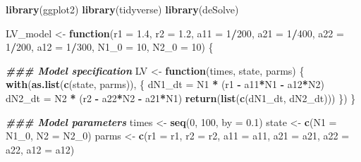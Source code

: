 \documentclass[
]{book}
\newenvironment{Shaded}{\begin{snugshade}}{\end{snugshade}}
\newcommand{\AttributeTok}[1]{\textcolor[rgb]{0.13,0.29,0.53}{#1}}
\newcommand{\ControlFlowTok}[1]{\textcolor[rgb]{0.13,0.29,0.53}{\textbf{#1}}}
\newcommand{\DecValTok}[1]{\textcolor[rgb]{0.00,0.00,0.81}{#1}}
\newcommand{\DocumentationTok}[1]{\textcolor[rgb]{0.56,0.35,0.01}{\textbf{\textit{#1}}}}
\newcommand{\FloatTok}[1]{\textcolor[rgb]{0.00,0.00,0.81}{#1}}
\newcommand{\FunctionTok}[1]{\textcolor[rgb]{0.13,0.29,0.53}{\textbf{#1}}}
\newcommand{\NormalTok}[1]{#1}
\newcommand{\OtherTok}[1]{\textcolor[rgb]{0.56,0.35,0.01}{#1}}
\newcommand{\SpecialCharTok}[1]{\textcolor[rgb]{0.81,0.36,0.00}{\textbf{#1}}}
\begin{document}
\begin{Shaded}
\begin{Highlighting}[]
\FunctionTok{library}\NormalTok{(ggplot2)}
\FunctionTok{library}\NormalTok{(tidyverse)}
\FunctionTok{library}\NormalTok{(deSolve)}

\NormalTok{LV\_model }\OtherTok{\textless{}{-}} \ControlFlowTok{function}\NormalTok{(}\AttributeTok{r1 =} \FloatTok{1.4}\NormalTok{, }\AttributeTok{r2 =} \FloatTok{1.2}\NormalTok{, }
                     \AttributeTok{a11 =} \DecValTok{1}\SpecialCharTok{/}\DecValTok{200}\NormalTok{, }\AttributeTok{a21 =} \DecValTok{1}\SpecialCharTok{/}\DecValTok{400}\NormalTok{, }\AttributeTok{a22 =} \DecValTok{1}\SpecialCharTok{/}\DecValTok{200}\NormalTok{, }\AttributeTok{a12 =} \DecValTok{1}\SpecialCharTok{/}\DecValTok{300}\NormalTok{, }
                     \AttributeTok{N1\_0 =} \DecValTok{10}\NormalTok{, }\AttributeTok{N2\_0 =} \DecValTok{10}\NormalTok{) \{}

  \DocumentationTok{\#\#\# Model specification}
\NormalTok{  LV }\OtherTok{\textless{}{-}} \ControlFlowTok{function}\NormalTok{(times, state, parms) \{}
    \FunctionTok{with}\NormalTok{(}\FunctionTok{as.list}\NormalTok{(}\FunctionTok{c}\NormalTok{(state, parms)), \{}
\NormalTok{      dN1\_dt }\OtherTok{=}\NormalTok{ N1 }\SpecialCharTok{*}\NormalTok{ (r1 }\SpecialCharTok{{-}}\NormalTok{ a11}\SpecialCharTok{*}\NormalTok{N1 }\SpecialCharTok{{-}}\NormalTok{ a12}\SpecialCharTok{*}\NormalTok{N2)}
\NormalTok{      dN2\_dt }\OtherTok{=}\NormalTok{ N2 }\SpecialCharTok{*}\NormalTok{ (r2 }\SpecialCharTok{{-}}\NormalTok{ a22}\SpecialCharTok{*}\NormalTok{N2 }\SpecialCharTok{{-}}\NormalTok{ a21}\SpecialCharTok{*}\NormalTok{N1)}
      \FunctionTok{return}\NormalTok{(}\FunctionTok{list}\NormalTok{(}\FunctionTok{c}\NormalTok{(dN1\_dt, dN2\_dt)))}
\NormalTok{    \})}
\NormalTok{  \}}

  \DocumentationTok{\#\#\# Model parameters}
\NormalTok{  times }\OtherTok{\textless{}{-}} \FunctionTok{seq}\NormalTok{(}\DecValTok{0}\NormalTok{, }\DecValTok{100}\NormalTok{, }\AttributeTok{by =} \FloatTok{0.1}\NormalTok{)}
\NormalTok{  state }\OtherTok{\textless{}{-}} \FunctionTok{c}\NormalTok{(}\AttributeTok{N1 =}\NormalTok{ N1\_0, }\AttributeTok{N2 =}\NormalTok{ N2\_0)}
\NormalTok{  parms }\OtherTok{\textless{}{-}} \FunctionTok{c}\NormalTok{(}\AttributeTok{r1 =}\NormalTok{ r1, }\AttributeTok{r2 =}\NormalTok{ r2, }\AttributeTok{a11 =}\NormalTok{ a11, }\AttributeTok{a21 =}\NormalTok{ a21, }\AttributeTok{a22 =}\NormalTok{ a22, }\AttributeTok{a12 =}\NormalTok{ a12)}


\end{Highlighting}
\end{Shaded}
\end{document}
